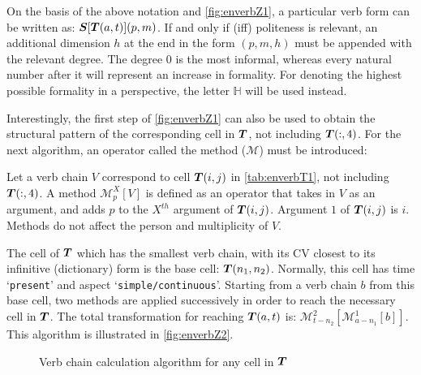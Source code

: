 On the basis of the above notation and \autoref{fig:enverbZ1}, a particular verb form can be written as: $\boldsymbol{S}[\boldsymbol{T}(a,t)](p,m)$. If and only if (iff) politeness is relevant, an additional dimension $h$ at the end  in the form $(p,m,h)$ must be appended with the relevant degree. The degree $0$ is the most informal, whereas every natural number after it will represent an increase in formality. For denoting the highest possible formality in a perspective, the letter $\mathbb{H}$ will be used instead.

Interestingly, the first step of \autoref{fig:enverbZ1} can also be used to  obtain the structural pattern of the corresponding cell in $\boldsymbol{T}$, not including $\boldsymbol{T}(:,4)$. For the next algorithm, an operator called the method ($\mathcal{M}$) must be introduced:
\begin{syntax}
    Let a verb chain $V$ correspond to cell $\boldsymbol{T}(i,j)$ in \autoref{tab:enverbT1}, not including $\boldsymbol{T}(:,4)$. A method $\mathcal{M}^{X}_{p}[V]$ is defined as an operator that takes in $V$ as an argument, and adds $p$ to the $X^{th}$ argument of $\boldsymbol{T}(i,j)$. Argument $1$ of $\boldsymbol{T}(i,j)$ is $i$. Methods do not affect the person and multiplicity of $V$.
\end{syntax}
The cell of $\boldsymbol{T}$ which has the smallest verb chain, with its CV closest to its  infinitive (dictionary) form is the base cell: $\boldsymbol{T}(n_1,n_2)$. Normally, this cell   has time `\texttt{present}' and aspect `\texttt{simple/continuous}'. Starting from a verb chain $b$ from this base cell, two methods are applied successively in order to reach the necessary cell in $\boldsymbol{T}$. The total transformation for reaching $\boldsymbol{T}(a,t)$ is: $\mathcal{M}^{2}_{t-n_2}[\mathcal{M}^{1}_{a-n_1}[b]]$. This algorithm is illustrated in \autoref{fig:enverbZ2}.
\begin{figure}[bth]
    \centering
{}
\caption{Verb chain calculation algorithm for any cell in $\boldsymbol{T}$}
\label{fig:enverbZ2}
\end{figure}

